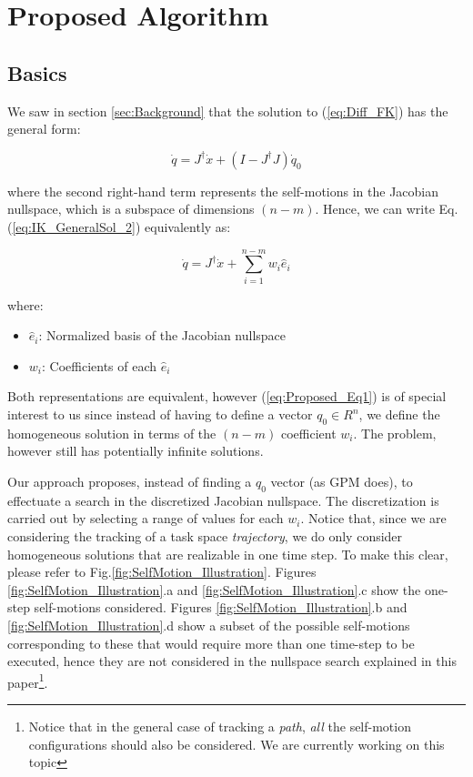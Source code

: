 \documentclass[conference]{IEEEtran}
\newcommand{\J}{\ensuremath{J}}
\newcommand{\Jps}{\ensuremath{J^{\dagger}}}
\newcommand{\dx}{\ensuremath{\dot{x}}}
\newcommand{\dq}{\ensuremath{\dot{q}}}
\newcommand{\q}{\ensuremath{q}}
\newcommand{\nsb}{\ensuremath{\hat{e}}} %
\newcommand{\nsc}{\ensuremath{w}}  %
\begin{document}
\section{Proposed Algorithm}
\label{sec:ProposedAlgorithm}

\subsection{Basics}
We saw in section \ref{sec:Background} that the solution to (\ref{eq:Diff_FK}) has the general form:

\begin{equation}
\dq = \Jps \dx + (I - \Jps \J)\dq_{0}
\label{eq:IK_GeneralSol_2}
\end{equation}

where the second right-hand term represents the self-motions in the Jacobian nullspace, which is a
subspace of dimensions $(n-m)$. Hence, we can write Eq.(\ref{eq:IK_GeneralSol_2}) equivalently as:

\begin{equation}
\dq = \Jps \dx + \displaystyle \sum_{i=1}^{n-m} \nsc_{i}\nsb_{i}
\label{eq:Proposed_Eq1}
\end{equation}

where:
\begin{itemize}
\item{ $\nsb_{i}$: Normalized basis of the Jacobian nullspace}
\item{$\nsc_{i}$: Coefficients of each $\nsb_{i}$}
\end{itemize}

Both representations are equivalent, however (\ref{eq:Proposed_Eq1}) is of special interest to us since
instead of having to define a vector $\q_{0} \in R^{n}$, we define the homogeneous solution in terms of 
the $(n-m)$ coefficient $\nsc_{i}$. The problem, however still has potentially infinite solutions.

Our approach proposes, instead of finding a $\q_{0}$ vector (as GPM does), to effectuate a 
search in the discretized Jacobian nullspace. The discretization is carried out by selecting a range of
values for each $\nsc_{i}$. Notice that, since we are considering the tracking of a task space \textit{trajectory}, 
we do only consider homogeneous solutions that are realizable in one time step. To make this clear, please refer 
to Fig.\ref{fig:SelfMotion_Illustration}. Figures \ref{fig:SelfMotion_Illustration}.a and 
\ref{fig:SelfMotion_Illustration}.c show the one-step self-motions considered. Figures \ref{fig:SelfMotion_Illustration}.b 
and \ref{fig:SelfMotion_Illustration}.d show a subset of the possible self-motions corresponding to these 
that would require more than one time-step to be executed, hence they are not considered in 
the nullspace search explained in this paper\footnote{Notice that in the
general case of tracking a \textit{path}, \textit{all} the self-motion configurations should also be considered. We
are currently working on this topic}.     
\end{document}
